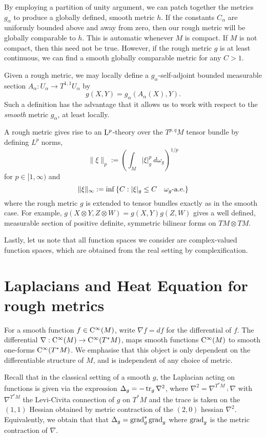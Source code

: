 \documentclass[a4paper, 12pt]{amsart}
\begin{document}
\begin{rem}
By employing a partition of unity argument, we can patch together the metrics \(g_{\alpha}\) to produce a globally defined, smooth metric \(h\). If the constants \(C_{\alpha}\) are uniformly bounded above and away from zero, then our rough metric will be globally comparable to \(h\). This is automatic whenever \(M\) is compact. If \(M\) is not compact, then this need not be true.
However, if the rough metric $g$ is at least continuous, we can find a smooth globally comparable metric for any $C > 1$. 
\end{rem}

Given a rough metric, we may locally define a \(g_{\alpha}\)-self-adjoint bounded measurable section \(A_{\alpha} : U_{\alpha} \to T^{1,1}U_{\alpha}\) by
\[
g(X, Y) = g_{\alpha} (A_{\alpha} (X), Y).
\]
Such a definition has the advantage that it allows us to work with respect to the \emph{smooth} metric \(g_{\alpha}\), 
at least locally.

A rough metric gives rise to an ${\rm L}^{p}_{\rm {}}$-theory over the $T^{p,q}M$ tensor bundle by defining \(L^p\) norms,
\[
\|\xi\|_p := \left(\int_{M} |\xi|_{g}^p\ d\omega_g\right)^{1/p}
\]
for $p \in [1, \infty)$ and
\[
\|\xi\|_{\infty} := \inf\left\{C: |\xi|_g \leq C\quad \omega_g\text{-a.e.}\right\}
\]
where the rough metric \(g\) is extended to tensor bundles exactly as in the smooth case. For example, \(g(X \otimes Y, Z \otimes W) = g(X, Y) g(Z, W)\) gives a well defined, measurable section of positive definite, symmetric bilinear forms on \(TM \otimes TM\).

Lastly, let us note that all function spaces we consider are complex-valued function spaces, which are obtained from the real setting by complexification.


\section{Laplacians and Heat Equation for rough metrics}


For a smooth function \(f \in {\rm C}^{\infty}_{\rm {}}(M)\), write \(\nabla f = df\) for the differential of \(f\). 
The differential \(\nabla : {\rm C}^{\infty}_{\rm {}}(M) \to {\rm C}^{\infty}_{\rm {}}(T^{\ast} M)\), maps smooth functions 
\({\rm C}^{\infty}_{\rm {}}(M)\) to smooth one-forms \({\rm C}^{\infty}_{\rm {}}(T^{\ast} M)\). 
We emphasise that this object is only dependent on the differentiable structure of $M$, and is independent of any choice of metric.

Recall that in the classical setting of a smooth $g$,  the Laplacian acting on functions is given  via the expression $\Delta_g = - \operatorname{tr}_g \nabla^2$, where $\nabla^2 = \nabla^{T^\ast M} \comp \nabla$
with $\nabla^{T^\ast M}$ the Levi-Civita connection of $g$ on \(T^{\ast} M\) and the trace is taken on the \((1,1)\) Hessian obtained by metric contraction of the \((2, 0)\) hessian \(\nabla^2\). Equivalently, we obtain that  that \(\Delta_g = \operatorname{grad}_g^\ast \operatorname{grad}_g\) where \(\operatorname{grad}_g\) is the metric contraction of \(\nabla\).
\end{document}
